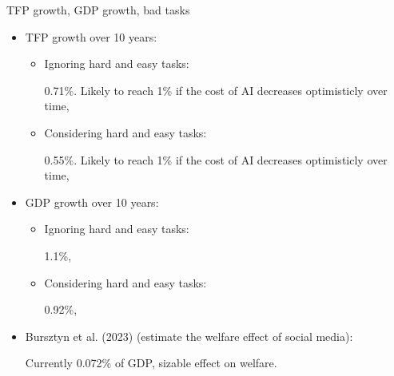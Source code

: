 \documentclass{beamer}
\begin{document}
    
\begin{frame}{TFP growth, GDP growth, bad tasks}
    
    \begin{itemize}
        \item TFP growth over 10 years:
        \begin{itemize}
            \item Ignoring hard and easy tasks:
            
            0.71\%. Likely to reach 1\% if the cost of AI decreases optimisticly over time,
            
            \item Considering hard and easy tasks:
            
            0.55\%. Likely to reach 1\% if the cost of AI decreases optimisticly over time,   
        \end{itemize}
        \item GDP growth over 10 years:
        \begin{itemize}
            \item Ignoring hard and easy tasks:
            
            1.1\%,

            \item Considering hard and easy tasks:
            
            0.92\%,
        \end{itemize}
        \item Bursztyn et al. (2023) (estimate the welfare effect of social media):
        
        Currently 0.072\% of GDP, sizable effect on welfare.
    \end{itemize}

\end{frame}   
    
\end{document}

